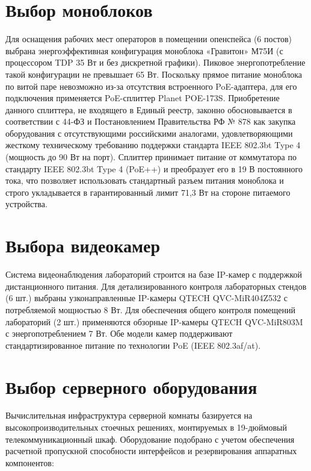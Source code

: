 \documentclass{bmstu}
\begin{document}
\section{Выбор моноблоков}

Для оснащения рабочих мест операторов в помещении опенспейса (6 постов) выбрана энергоэффективная конфигурация моноблока «Гравитон» М75И (с процессором TDP 35 Вт и без дискретной графики). Пиковое энергопотребление такой конфигурации не превышает 65 Вт. Поскольку прямое питание моноблока по витой паре невозможно из-за отсутствия встроенного PoE-адаптера, для его подключения применяется PoE-сплиттер Planet POE-173S. Приобретение данного сплиттера, не входящего в Единый реестр, законно обосновывается в соответствии с 44-ФЗ и Постановлением Правительства РФ № 878 как закупка оборудования с отсутствующими российскими аналогами, удовлетворяющими жесткому техническому требованию поддержки стандарта IEEE 802.3bt Type 4 (мощность до 90 Вт на порт). Сплиттер принимает питание от коммутатора по стандарту IEEE 802.3bt Type 4 (PoE++) и преобразует его в 19 В постоянного тока, что позволяет использовать стандартный разъем питания моноблока и строго укладывается в гарантированный лимит 71,3 Вт на стороне питаемого устройства.


\section{Выбора видеокамер}

Система видеонаблюдения лабораторий строится на базе IP-камер с поддержкой дистанционного питания. Для детализированного контроля лабораторных стендов (6 шт.) выбраны узконаправленные IP-камеры QTECH QVC-MiR404Z532 с потребляемой мощностью 8 Вт. Для обеспечения общего контроля помещений лабораторий (2 шт.) применяются обзорные IP-камеры QTECH QVC-MiR803M с энергопотреблением 7 Вт. Обе модели камер поддерживают стандартизированное питание по технологии PoE (IEEE 802.3af/at). 



\section{Выбор серверного оборудования}

Вычислительная инфраструктура серверной комнаты базируется на высокопроизводительных стоечных решениях, монтируемых в 19-дюймовый телекоммуникационный шкаф. Оборудование подобрано с учетом обеспечения расчетной пропускной способности интерфейсов и резервирования аппаратных компонентов:
\end{document}
